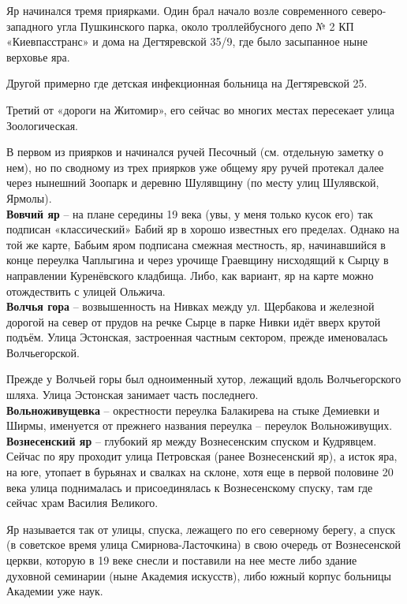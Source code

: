 Яр начинался тремя приярками. Один брал начало возле современного северо-западного угла Пушкинского парка, около троллейбусного депо № 2 КП «Киевпасстранс» и дома на Дегтяревской 35/9, где было засыпанное ныне верховье яра.

Другой примерно где детская инфекционная больница на Дегтяревской 25. 

Третий от «дороги на Житомир», его сейчас во многих местах пересекает улица Зоологическая. 

В первом из приярков и начинался ручей Песочный (см. отдельную заметку о нем), но по сводному из трех приярков уже общему яру ручей протекал далее через нынешний Зоопарк и деревню Шулявщину (по месту улиц Шулявской, Ярмолы).\\

\textbf{Вовчий яр} – на плане середины 19 века (увы, у меня только кусок его) так подписан «классический» Бабий яр в хорошо известных его пределах. Однако на той же карте, Бабьим яром подписана смежная местность, яр, начинавшийся в конце переулка Чаплыгина и через урочище Граевщину нисходящий к Сырцу в направлении Куренёвского кладбища. Либо, как вариант, яр на карте можно отождествить с улицей Ольжича.\\

\textbf{Волчья гора} – возвышенность на Нивках между ул. Щербакова и железной дорогой на север от прудов на речке Сырце в парке Нивки идёт вверх крутой подъём. Улица Эстонская, застроенная частным сектором, прежде именовалась Волчьегорской.

Прежде у Волчьей горы был одноименный хутор, лежащий вдоль Волчьегорского шляха. Улица Эстонская занимает часть последнего.\\

\textbf{Вольноживущевка} – окрестности переулка Балакирева на стыке Демиевки и Ширмы, именуется от прежнего названия переулка – переулок Вольноживущих.\\

\textbf{Вознесенский яр} – глубокий яр между Вознесенским спуском и Кудрявцем. Сейчас по яру проходит улица Петровская (ранее Вознесенский яр), а исток яра, на юге, утопает в бурьянах и свалках на склоне, хотя еще в первой половине 20 века улица поднималась и присоединялась к Вознесенскому спуску, там где сейчас храм Василия Великого. 

Яр называется так от улицы, спуска, лежащего по его северному берегу, а спуск (в советское время улица Смирнова-Ласточкина) в свою очередь от Вознесенской церкви, которую в 19 веке снесли и поставили на нее месте либо здание духовной семинарии (ныне Академия искусств), либо южный корпус больницы Академии уже наук.

